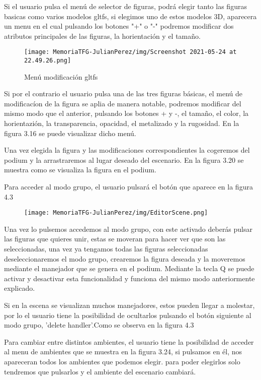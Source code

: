\documentclass[a4paper, 12pt]{book}
\begin{document}
Si el usuario pulsa el menú de selector de figuras, podrá elegir tanto las figuras basicas como varios modelos gltfs, si elegimos uno de estos modelos 3D, aparecera un menu en el cual pulsando los botones "+" o "-" podremos modificar dos atributos principales de las figuras, la horientación y el tamaño.

\begin{figure}[H]
  \centering
  \texttt{[image: MemoriaTFG-JulianPerez/img/Screenshot 2021-05-24 at 22.49.26.png]}
  \caption{Menú modificación gltfs}\label{home}
\end{figure}

Si por el contrario el usuario pulsa una de las tres figuras básicas, el menú de modificacíon de la figura se aplia de manera notable, podremos modificar del mismo modo que el anterior, pulsando los botones + y -, el tamaño, el color, la horientazión, la transparencia, opacidad, el metalizado y la rugosidad. En la figura 3.16 se puede visualizar dicho menú.

Una vez elegida la figura y las modificaciones correspondientes la cogeremos del podium y la arrastraremos al lugar deseado del escenario. En la figura 3.20 se muestra como se visualiza la figura en el podium.

Para acceder al modo grupo, el usuario pulsará el botón que aparece en la figura 4.3 
\begin{figure}[H]
  \centering
  \texttt{[image: MemoriaTFG-JulianPerez/img/EditorScene.png]}
  \caption{}\label{home}
\end{figure}

Una vez lo pulsemos accedemos al modo grupo, con este activado deberás pulsar las figuras que quieres unir, estas se moveran para hacer ver que son las seleccionadas, una vez ya tengamos todas las figuras seleccionadas deseleccionaremos el modo grupo, crearemos la figura deseada y la moveremos mediante el manejador que se genera en el podium. Mediante la tecla Q se puede activar y desactivar esta funcionalidad y funciona del mismo modo anteriormente explicado.

Si en la escena se visualizan muchos manejadores, estos pueden llegar a molestar, por lo el usuario tiene la posibilidad de ocultarlos pulsando el botón siguiente al modo grupo, 'delete handler'.Como se observa en la figura 4.3

Para cambiar entre distintos ambientes, el usuario tiene la posibilidad de acceder al menu de ambientes que se muestra en la figura 3.24, si pulsamos en él, nos apareceran todos los ambientes que podemos elegir. para poder elegirlos solo tendremos que pulsarlos y el ambiente del escenario cambiará.
\end{document}
